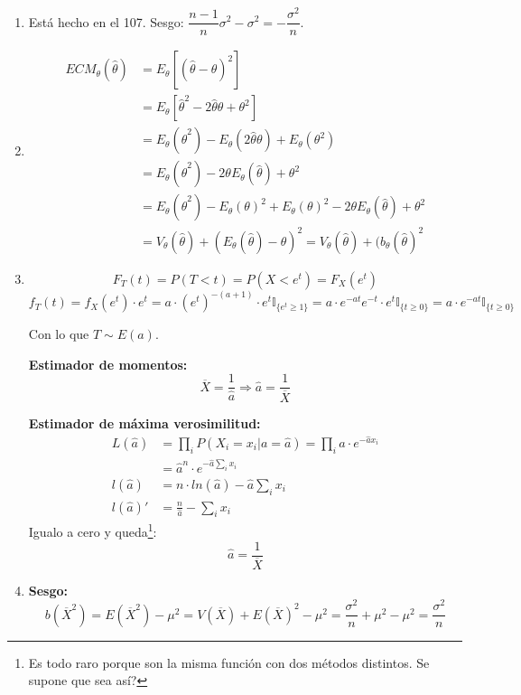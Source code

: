 \begin{enumerate}
	\item
		Está hecho en el 107. Sesgo: $\dfrac{n-1}{n}\sigma^2 - \sigma^2 = -\dfrac{\sigma^2}{n}$.
	\item
		\begin{align*}
			ECM_{\theta}(\hat\theta)	& = E_{\theta} [(\hat\theta - \theta)^2]						\\
										& = E_{\theta} [\hat\theta^2 - 2\hat\theta \theta + \theta^2]	\\
										& = E_{\theta} (\hat\theta^2) - E_{\theta}(2\hat\theta \theta) + E_{\theta}(\theta^2)	\\
										& = E_{\theta} (\hat\theta^2) - 2\theta E_{\theta}(\hat\theta) + \theta^2	\\
										& = E_{\theta} (\hat\theta^2) - E_{\theta}(\theta)^2 + E_{\theta}(\theta)^2 - 2\theta E_{\theta}(\hat\theta) + \theta^2	\\
										& = V_{\theta}(\hat\theta) + (E_{\theta}(\hat\theta)-\theta)^2 = V_{\theta}(\hat\theta) + (b_{\theta}(\hat\theta)^2
		\end{align*}
	
	\item
		$$F_T(t) = P(T<t) = P(X < e^t) = F_X(e^t)$$
		$$f_T(t) = f_X(e^t) \cdot e^t
			= a\cdot (e^t)^{-(a+1)}\cdot e^t \mathbb{I}_{\{e^t \geq 1\}}
			= a\cdot e^{-at} e^{-t} \cdot e^t \mathbb{I}_{\{t \geq 0\}}
			= a\cdot e^{-at} \mathbb{I}_{\{t \geq 0\}}$$
			
		Con lo que $T\sim E(a)$.
		
		\textbf{Estimador de momentos:}
		$$\overline{X} = \frac{1}{\hat a} \Rightarrow \hat a = \frac{1}{\overline X}$$
		
		\textbf{Estimador de máxima verosimilitud:}
		\begin{align*}
			L(\hat a)	& = \prod_i P(X_i = x_i | a = \hat a) = \prod_i \hat a\cdot e^{-\hat a x_i}		\\
						& = \hat a^n \cdot e^{-\hat a \sum_i x_i}										\\
			l(\hat a)	& = n\cdot ln(\hat a) - \hat a \sum_i x_i										\\
			l(\hat a)'	& = \frac{n}{\hat a} - \sum_i x_i
		\end{align*}
		Igualo a cero y queda\footnote{Es todo raro porque son la misma función con dos métodos distintos. Se supone que sea así?}:
		$$\hat a = \frac{1}{\overline X}$$
		
	\item
	\textbf{Sesgo:}
		$$b(\overline X^2) = E(\overline X^2) - \mu^2 = V(\overline X) + E(\overline X)^2 - \mu^2
			= \frac{\sigma^2}{n} + \mu^2 - \mu^2 = \frac{\sigma^2}{n}$$
			

\end{enumerate}
